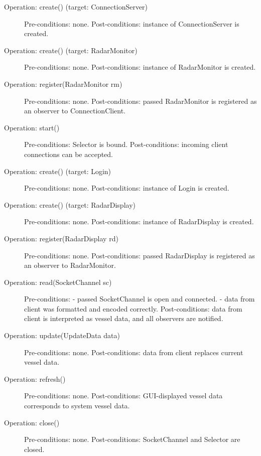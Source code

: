 \documentclass{article}
\begin{document}
\break
\begin{description}
  \item[Operation: create() (target: ConnectionServer)] Pre-conditions: none.\newline
  Post-conditions: instance of ConnectionServer is created.
  \item[Operation: create() (target: RadarMonitor)] Pre-conditions: none.\newline
  Post-conditions: instance of RadarMonitor is created.
  \item[Operation: register(RadarMonitor rm)] Pre-conditions: none.\newline
  Post-conditions: passed RadarMonitor is registered as an observer to ConnectionClient.
  \item[Operation: start()] Pre-conditions: Selector is bound.\newline
  Post-conditions: incoming client connections can be accepted.
  \item[Operation: create() (target: Login)] Pre-conditions: none.\newline
  Post-conditions: instance of Login is created.
  \item[Operation: create() (target: RadarDisplay)] Pre-conditions: none.\newline
  Post-conditions: instance of RadarDisplay is created.
  \item[Operation: register(RadarDisplay rd)] Pre-conditions: none.\newline
  Post-conditions: passed RadarDisplay is registered as an observer to RadarMonitor.
  \item[Operation: read(SocketChannel sc)] Pre-conditions:
  - passed SocketChannel is open and connected.\newline
  - data from client was formatted and encoded correctly.\newline
  Post-conditions: data from client is interpreted as vessel data, and all observers are notified.
  \item[Operation: update(UpdateData data)] Pre-conditions: none.\newline
 Post-conditions: data from client replaces current vessel data.
  \item[Operation: refresh()] Pre-conditions: none.\newline
  Post-conditions: GUI-displayed vessel data corresponds to system vessel data.
  \item[Operation: close()] Pre-conditions: none.\newline
  Post-conditions: SocketChannel and Selector are closed.
\end{description}
\end{document}
